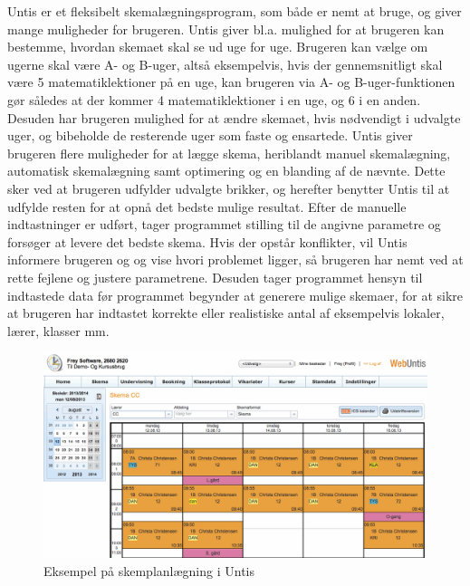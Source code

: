 Untis er et fleksibelt skemalægningsprogram, som både er nemt at bruge, og giver mange muligheder for brugeren. Untis giver bl.a. mulighed for at brugeren kan bestemme, hvordan skemaet skal se ud uge for uge. Brugeren kan vælge om ugerne skal være A- og B-uger, altså eksempelvis, hvis der gennemsnitligt skal være 5 matematiklektioner på en uge, kan brugeren via A- og B-uger-funktionen gør således at der kommer 4 matematiklektioner i en uge, og 6 i en anden. Desuden har brugeren mulighed for at ændre skemaet, hvis nødvendigt i udvalgte uger, og bibeholde de resterende uger som faste og ensartede. 
Untis giver brugeren flere muligheder for at lægge skema, heriblandt manuel skemalægning, automatisk skemalægning samt optimering og en blanding af de nævnte. Dette sker ved at brugeren udfylder udvalgte brikker, og herefter benytter Untis til at udfylde resten for at opnå det bedste mulige resultat. Efter de manuelle indtastninger er udført, tager programmet stilling til de angivne parametre og forsøger at levere det bedste skema. Hvis der opstår konflikter, vil Untis informere brugeren og og vise hvori problemet ligger, så brugeren har nemt ved at rette fejlene og justere parametrene. Desuden tager programmet hensyn til indtastede data før programmet begynder at generere mulige skemaer, for at sikre at brugeren har indtastet korrekte eller realistiske antal af eksempelvis lokaler, lærer, klasser mm\cite{untis2016}.
\begin{figure}[!h]
  \centering
  \includegraphics[width=\textwidth]{partials/graphics/untis.png}
  \caption{Eksempel på skemplanlægning i Untis}
  \label{fig:lantiv}
\end{figure}
